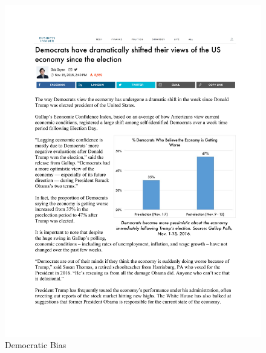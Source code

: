 \documentclass[12pt, letterpaper]{article}
\begin{document}
\begin{figure}[H]
\centering
{}
\caption{Democratic Bias}
\includegraphics[width=1.05\textwidth]{../figs/yg_treats/dem_motivate.pdf}
\smallskip
\end{figure}
\end{document}
